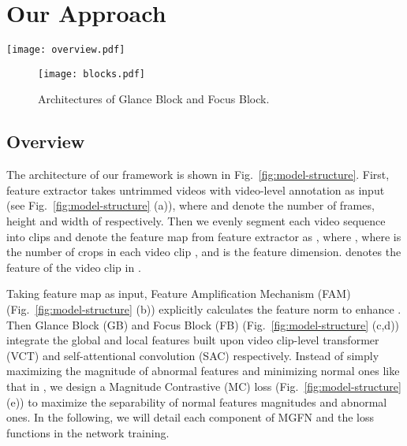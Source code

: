 \documentclass[letterpaper]{article} \usepackage{aaai23}  \usepackage{times}  \usepackage{helvet}  \usepackage{courier}  \usepackage[hyphens]{url}  \usepackage{graphicx} \urlstyle{rm} \def\UrlFont{\rm}  \usepackage{natbib}  \usepackage{caption} \frenchspacing  \setlength{\pdfpagewidth}{8.5in}  \setlength{\pdfpageheight}{11in}  \usepackage{algorithm}
\begin{document}
\section{Our Approach}

\begin{figure*}[!t]
\centering
\texttt{[image: overview.pdf]}
\vspace*{-2mm}
\caption{The overview of our MGFN network architecture. The framework takes {\small} normal videos and {\small} abnormal videos as input. After (a) Feature extractor, (b) Feature Amplification Mechanism (FAM) calculates the feature magnitude and incorporates it as a residue explicitly. Then (c) Glance Block (GB) and (d) Focus Block (FB) extract the global context information and enhance the local feature respectively. (e) Magnitude Contrastive (MC) loss encourages the separability of normal and abnormal features by shrinking the intra-category feature magnitude distances and enlarge the inter-category differences using the top-k normal and abnormal feature magnitudes.}
\vspace*{-3mm}
\label{fig:model-structure}
\end{figure*}

\begin{figure}
\centering
\texttt{[image: blocks.pdf]}
\vspace{-2mm}
\caption{Architectures of Glance Block and Focus Block.}
\vspace{-4mm}
\label{fig:block-structure}
\end{figure}


\subsection{Overview}
The architecture of our framework is shown in Fig.~\ref{fig:model-structure}. First, feature extractor takes {\small } untrimmed videos {\small} with video-level annotation as input (see Fig.~\ref{fig:model-structure} (a)), where {\small} and {\small} denote the number of frames, height and width of {\small} respectively. Then we evenly segment each video sequence into {\small} clips and denote the feature map from feature extractor as {\small}, where {\small}, where {\small} is the number of crops in each video clip \cite{RWAD}, and {\small} is the feature dimension. {\small} denotes the feature of the {\small} video clip in {\small}. 


Taking feature map {\small} as input, Feature Amplification Mechanism (FAM) (Fig.~\ref{fig:model-structure} (b)) explicitly calculates the feature norm {\small} to enhance {\small}. Then Glance Block (GB) and Focus Block (FB) (Fig.~\ref{fig:model-structure} (c,d)) integrate the global and local features built upon video clip-level transformer (VCT) and self-attentional convolution (SAC) respectively. Instead of simply maximizing the magnitude of abnormal features {\small} and minimizing normal ones {\small} like that in \cite{RTFM}, we design a Magnitude Contrastive (MC) loss (Fig.~\ref{fig:model-structure} (e)) to maximize the separability of normal features magnitudes and abnormal ones. In the following, we will detail each component of MGFN and the loss functions in the network training. 
\end{document}
